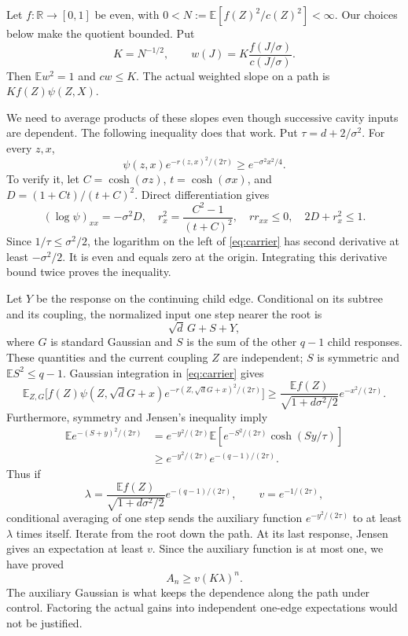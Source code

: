 \documentclass[11pt]{article}
\theoremstyle{definition}
\theoremstyle{remark}
\newcommand{\E}{\mathbb E}
\newcommand{\R}{\mathbb R}
\begin{document}
Let $f:\R\to[0,1]$ be even, with $0<N:=\E[f(Z)^2/c(Z)^2]<\infty$.
Our choices below make the quotient bounded. Put
\[
 K=N^{-1/2},\qquad w(J)=K\frac{f(J/\sigma)}{c(J/\sigma)}.
\]
Then $\E w^2=1$ and $cw\le K$. The actual weighted slope on a path is
$Kf(Z)\psi(Z,X)$.

We need to average products of these slopes even though successive cavity
inputs are dependent. The following inequality does that work. Put
$\tau=d+2/\sigma^2$. For every $z,x$,
\begin{equation}
 \psi(z,x)e^{-r(z,x)^2/(2\tau)}\ge e^{-\sigma^2x^2/4}.
 \label{eq:carrier}
\end{equation}
To verify it, let $C=\cosh(\sigma z)$, $t=\cosh(\sigma x)$, and
$D=(1+Ct)/(t+C)^2$. Direct differentiation gives
\[
 (\log\psi)_{xx}=-\sigma^2D,\quad
 r_x^2=\frac{C^2-1}{(t+C)^2},\quad rr_{xx}\le0,\quad 2D+r_x^2\le1.
\]
Since $1/\tau\le\sigma^2/2$, the logarithm on the left of
\eqref{eq:carrier} has second derivative at least $-\sigma^2/2$.
It is even and equals zero at the origin. Integrating this derivative
bound twice proves the inequality.

Let $Y$ be the response on the continuing child edge. Conditional on its
subtree and its coupling, the normalized input one step nearer the root is
\[
 \sqrt d\,G+S+Y,
\]
where $G$ is standard Gaussian and $S$ is the sum of the other $q-1$
child responses. These quantities and the current coupling $Z$ are
independent; $S$ is symmetric and $\E S^2\le q-1$. Gaussian integration in
\eqref{eq:carrier} gives
\[
 \E_{Z,G}\bigl[f(Z)\psi(Z,\sqrt dG+x)
                   e^{-r(Z,\sqrt dG+x)^2/(2\tau)}\bigr]
 \ge\frac{\E f(Z)}{\sqrt{1+d\sigma^2/2}}e^{-x^2/(2\tau)}.
\]
Furthermore, symmetry and Jensen's inequality imply
\begin{align*}
 \E e^{-(S+y)^2/(2\tau)}
 &=e^{-y^2/(2\tau)}\E[e^{-S^2/(2\tau)}\cosh(Sy/\tau)]\\
 &\ge e^{-y^2/(2\tau)}e^{-(q-1)/(2\tau)}.
\end{align*}
Thus if
\begin{equation}
 \lambda=\frac{\E f(Z)}{\sqrt{1+d\sigma^2/2}}
              e^{-(q-1)/(2\tau)},\qquad v=e^{-1/(2\tau)},
 \label{eq:simple-lambda}
\end{equation}
conditional averaging of one step sends the auxiliary function
$e^{-y^2/(2\tau)}$ to at least $\lambda$ times itself. Iterate from the
root down the path. At its last response, Jensen gives an expectation at
least $v$. Since the auxiliary function is at most one, we have proved
\begin{equation}
 A_n\ge v(K\lambda)^n.
 \label{eq:path-gain}
\end{equation}
The auxiliary Gaussian is what keeps the dependence along the path under
control. Factoring the actual gains into independent one-edge expectations
would not be justified.
\end{document}
